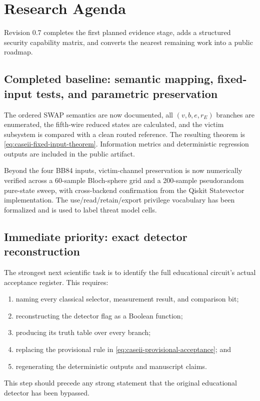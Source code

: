 \section{Research Agenda}
\label{sec:research-agenda}

Revision 0.7 completes the first planned evidence stage, adds a structured
security capability matrix, and converts the nearest remaining work into a
public roadmap.

\subsection{Completed baseline: semantic mapping, fixed-input tests, and
parametric preservation}

The ordered SWAP semantics are now documented, all $(v,b,e,r_E)$ branches are
enumerated, the fifth-wire reduced states are calculated, and the victim
subsystem is compared with a clean routed reference. The resulting theorem is
\cref{eq:caseii-fixed-input-theorem}. Information metrics and deterministic
regression outputs are included in the public artifact.

Beyond the four BB84 inputs, victim-channel preservation is now numerically
verified across a 60-sample Bloch-sphere grid and a 200-sample pseudorandom
pure-state sweep, with cross-backend confirmation from the Qiskit Statevector
implementation. The use/read/retain/export privilege vocabulary has been
formalized and is used to label threat model cells.

\subsection{Immediate priority: exact detector reconstruction}

The strongest next scientific task is to identify the full educational
circuit's actual acceptance register. This requires:
\begin{enumerate}
  \item naming every classical selector, measurement result, and comparison bit;
  \item reconstructing the detector flag as a Boolean function;
  \item producing its truth table over every branch;
  \item replacing the provisional rule in
  \cref{eq:caseii-provisional-acceptance}; and
  \item regenerating the deterministic outputs and manuscript claims.
\end{enumerate}
This step should precede any strong statement that the original educational
detector has been bypassed.

